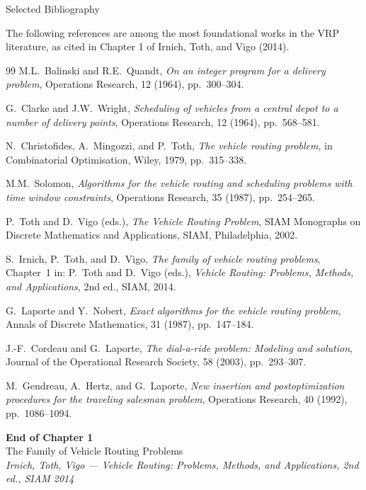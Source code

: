 \documentclass[aspectratio=169,10pt]{beamer}
\begin{document}
\begin{frame}[allowframebreaks]{Selected Bibliography}

The following references are among the most foundational works in the VRP literature,
as cited in Chapter 1 of Irnich, Toth, and Vigo (2014).

\medskip
\begin{thebibliography}{99}\small
{}
  M.L.~Balinski and R.E.~Quandt,
  \emph{On an integer program for a delivery problem},
  Operations Research, 12 (1964), pp.~300--304.

  G.~Clarke and J.W.~Wright,
  \emph{Scheduling of vehicles from a central depot to a number of delivery points},
  Operations Research, 12 (1964), pp.~568--581.

  N.~Christofides, A.~Mingozzi, and P.~Toth,
  \emph{The vehicle routing problem},
  in Combinatorial Optimisation, Wiley, 1979, pp.~315--338.

  M.M.~Solomon,
  \emph{Algorithms for the vehicle routing and scheduling problems with time window
  constraints},
  Operations Research, 35 (1987), pp.~254--265.

  P.~Toth and D.~Vigo (eds.),
  \emph{The Vehicle Routing Problem},
  SIAM Monographs on Discrete Mathematics and Applications, SIAM, Philadelphia, 2002.

  S.~Irnich, P.~Toth, and D.~Vigo,
  \emph{The family of vehicle routing problems},
  Chapter~1 in: P.~Toth and D.~Vigo (eds.),
  \emph{Vehicle Routing: Problems, Methods, and Applications},
  2nd ed., SIAM, 2014.

  G.~Laporte and Y.~Nobert,
  \emph{Exact algorithms for the vehicle routing problem},
  Annals of Discrete Mathematics, 31 (1987), pp.~147--184.

  J.-F.~Cordeau and G.~Laporte,
  \emph{The dial-a-ride problem: Modeling and solution},
  Journal of the Operational Research Society, 58 (2003), pp.~293--307.

  M.~Gendreau, A.~Hertz, and G.~Laporte,
  \emph{New insertion and postoptimization procedures for the traveling salesman problem},
  Operations Research, 40 (1992), pp.~1086--1094.
\end{thebibliography}

\end{frame}

\begin{frame}[allowframebreaks]{}
  \begin{center}
    \Large\textbf{End of Chapter 1}\\[12pt]
    \normalsize The Family of Vehicle Routing Problems\\[8pt]
    \textit{Irnich, Toth, Vigo --- Vehicle Routing: Problems, Methods, and Applications, 2nd ed., SIAM 2014}
  \end{center}
\end{frame}
\end{document}
